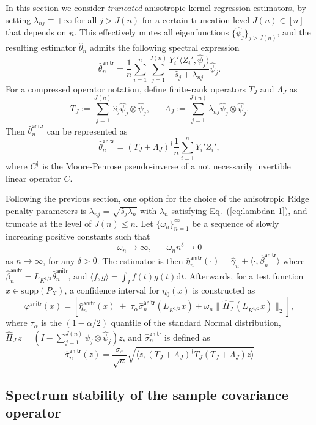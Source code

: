 \documentclass[11pt,a4paper]{article}
\renewcommand{\hat}{\widehat}
\theoremstyle{definition}
\theoremstyle{plain}
\theoremstyle{remark}
\newcommand{\supp}{\mathrm{supp}}
\newcommand{\ud}{\mathrm d}
\newcommand{\anitr}{\mathsf{anitr}}
\begin{document}
In this section we consider \emph{truncated} anisotropic kernel regression estimators, by setting $\lambda_{nj}\equiv +\infty$
for all $j> J(n)$ for a certain truncation level $J(n)\in[n]$ that depends on $n$.
This effectively mutes all eigenfunctions $\{\hat\psi_j\}_{j>J(n)}$, and the resulting estimator $\hat\theta_n$ admits the following spectral expression
\begin{equation}
\hat\theta_n^\anitr = \frac{1}{n}\sum_{i=1}^n\sum_{j=1}^{J(n)}\frac{Y_i'\langle Z_i',\hat\psi_j\rangle}{\hat s_j+\lambda_{nj}}\hat\psi_j.
\label{eq:anitr}
\end{equation}
For a compressed operator notation, define finite-rank operators $T_J$ and $\Lambda_J$ as
$$
T_J := \sum_{j=1}^{J(n)}\hat s_j\hat\psi_j\otimes\hat\psi_j,\;\;\;\;\;\; \Lambda_J := \sum_{j=1}^{J(n)}\lambda_{nj}\hat\psi_j\otimes\hat\psi_j.
$$
Then $\hat\theta_n^\anitr$ can be represented as
$$
\hat\theta_n^\anitr = (T_J+\Lambda_J)^{\dagger}\frac{1}{n}\sum_{i=1}^n Y_i'Z_i',
$$
where $C^\dagger$ is the Moore-Penrose pseudo-inverse of a not necessarily invertible linear operator $C$.

Following the previous section, one option for the choice of the anisotropic Ridge penalty parameters is $\lambda_{nj}=\sqrt{\hat s_j\lambda_n}$ with $\lambda_n$ satisfying Eq.~(\ref{eq:lambdan-1}),
and truncate at the level of $J(n)\leq n$.
Let $\{\omega_n\}_{n=1}^{\infty}$ be a sequence of slowly increasing positive constants such that
\begin{equation}
\omega_n\to\infty,\;\;\;\;\;\;\omega_n n^\delta\to 0
\label{eq:omega}
\end{equation}
as $n\to\infty$, for any $\delta>0$.
The estimator is then $\hat\eta_n^\anitr(\cdot)=\hat\gamma_n + \langle\cdot,\hat\beta_n^\anitr\rangle$ where $\hat\beta_n^\anitr = L_{K^{1/2}}\hat\theta_n^\anitr$,
and $\langle f,g\rangle = \int_I f(t)g(t)\ud t$.
Afterwards, for a test function $x\in\supp(P_X)$, a confidence interval for $\eta_0(x)$ is constructed as
$$
\varphi^\anitr(x) = [\hat\eta_n^\anitr(x)\;\pm\; \tau_{\alpha}\hat\sigma_n^\anitr(L_{K^{1/2}}x) + \omega_n\|\hat\Pi_J^\perp (L_{K^{1/2}}x)\|_2],
$$
where $\tau_{\alpha}$ is the $(1-\alpha/2)$ quantile of the standard Normal distribution, $\hat\Pi_J^\perp z=(I-\sum_{j=1}^{J(n)}\hat\psi_j\otimes\hat\psi_j)z$, and $\hat\sigma_n^\anitr$ is defined as
$$
\hat\sigma_n^\anitr(z) = \frac{\sigma_\varepsilon}{\sqrt{n}}\sqrt{\langle z, (T_J+\Lambda_J)^\dagger T_J(T_J+\Lambda_J)z\rangle}
$$


\subsection{Spectrum stability of the sample covariance operator}
\end{document}
